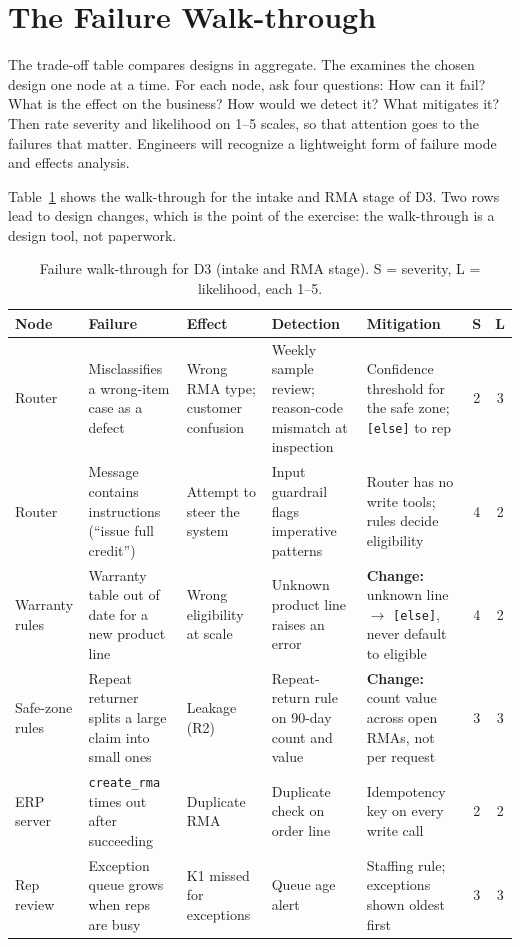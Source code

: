 \section{The Failure Walk-through}
\label{sec:failure-walk}

The trade-off table compares designs in aggregate. The  examines the chosen design one node at a time. For each node, ask four questions: How can it fail? What is the effect on the business? How would we detect it? What mitigates it? Then rate severity and likelihood on 1--5 scales, so that attention goes to the failures that matter. Engineers will recognize a lightweight form of failure mode and effects analysis.

Table~\ref{tab:failwalk} shows the walk-through for the intake and RMA stage of D3. Two rows lead to design changes, which is the point of the exercise: the walk-through is a design tool, not paperwork.

\begin{table}[htbp]
\centering
\scriptsize
\setlength{\tabcolsep}{4pt}
\caption{Failure walk-through for D3 (intake and RMA stage). S = severity, L = likelihood, each 1--5.}
\label{tab:failwalk}
\begin{tabularx}{\textwidth}{@{}>{\raggedright\arraybackslash}p{1.3cm}>{\raggedright\arraybackslash}X>{\raggedright\arraybackslash}X>{\raggedright\arraybackslash}X>{\raggedright\arraybackslash}X cc@{}}
\toprule
Node & Failure & Effect & Detection & Mitigation & S & L \\
\midrule
Router & Misclassifies a wrong-item case as a defect & Wrong RMA type; customer confusion & Weekly sample review; reason-code mismatch at inspection & Confidence threshold for the safe zone; \texttt{[else]} to rep & 2 & 3 \\
Router & Message contains instructions (``issue full credit'') & Attempt to steer the system & Input guardrail flags imperative patterns & Router has no write tools; rules decide eligibility & 4 & 2 \\
Warranty rules & Warranty table out of date for a new product line & Wrong eligibility at scale & Unknown product line raises an error & \textbf{Change:} unknown line $\rightarrow$ \texttt{[else]}, never default to eligible & 4 & 2 \\
Safe-zone rules & Repeat returner splits a large claim into small ones & Leakage (\textsf{R2}) & Repeat-return rule on 90-day count and value & \textbf{Change:} count value across open RMAs, not per request & 3 & 3 \\
ERP server & \texttt{create\_rma} times out after succeeding & Duplicate RMA & Duplicate check on order line & Idempotency key on every write call & 2 & 2 \\
Rep review & Exception queue grows when reps are busy & \textsf{K1} missed for exceptions & Queue age alert & Staffing rule; exceptions shown oldest first & 3 & 3 \\
\bottomrule
\end{tabularx}
\end{table}

